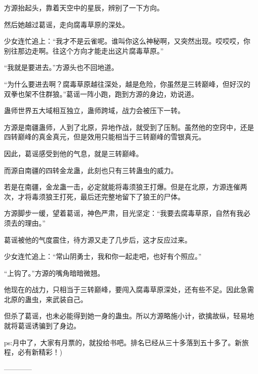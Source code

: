 \begin{this_body}
方源抬起头，靠着天空中的星辰，辨别了一下方向。

然后她越过葛谣，走向腐毒草原的深处。

少女连忙追上：“我才不是云雀呢。谁叫你这么神秘啊，又突然出现。哎哎哎，你别往那边走啊。往这个方向才能走出这片腐毒草原。”

“我就是要进去。”方源头也不回地道。

“为什么要进去啊？腐毒草原越往深处，越是危险，你虽然是三转巅峰，但好汉的双拳也架不住群狼。”葛谣一阵小跑，跑到方源的身边，劝说道。

蛊师世界五大域相互独立，蛊师跨域，战力会被压下一转。

方源是南疆蛊师，人到了北原，异地作战，就受到了压制。虽然他的空窍中，还是四转巅峰的真金真元，但是效用只能相当于三转巅峰的雪银真元。

因此，葛谣感受到他的气息，就是三转巅峰。

而源自南疆的四转金龙蛊，此刻也只有三转蛊虫的威力。

若是在南疆，金龙蛊一击，必定就能将毒须狼王打爆。但是在北原，方源连催两次，才将毒须狼王打死，最后还完整地留下了狼王的尸体。

方源脚步一缓，望着葛谣，神色严肃，目光坚定：“我要去腐毒草原，自然有我必须去的理由。”

葛谣被他的气度震住，待方源又走了几步后，这才反应过来。

少女连忙追上：“常山阴勇士，我和你一起走吧，也好有个照应。”

“上钩了。”方源的嘴角暗暗微翘。

他现在的战力，只相当于三转巅峰，要闯入腐毒草原深处，还有些不足。因此急需北原的蛊虫，来武装自己。

但杀了葛谣，也未必能得到她一身的蛊虫。所以方源略施小计，欲擒故纵，轻易地就将葛谣诱骗到了身边。

ps:月中了，大家有月票的，就投给书吧。排名已经从三十多落到五十多了。新旅程，必有新精彩！)

------------

\end{this_body}

